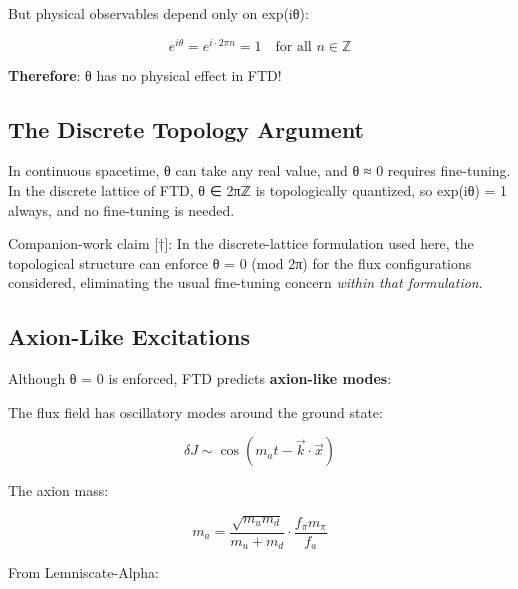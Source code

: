 \documentclass[
  11pt,
  letterpaper,
  twoside,
  openright]{book}
\begin{document}
But physical observables depend only on exp(iθ):

\[e^{i\theta} = e^{i \cdot 2\pi n} = 1 \quad \text{for all } n \in \mathbb{Z}\]

\textbf{Therefore}: θ has no physical effect in FTD!

\subsection{The Discrete Topology
Argument}\label{the-discrete-topology-argument}

In continuous spacetime, θ can take any real value, and θ ≈ 0 requires
fine-tuning. In the discrete lattice of FTD, θ ∈ 2πℤ is topologically
quantized, so exp(iθ) = 1 always, and no fine-tuning is needed.

\begin{tcolorbox}[enhanced jigsaw, coltitle=black, colbacktitle=quarto-callout-important-color!10!white, toprule=.15mm, colframe=quarto-callout-important-color-frame, arc=.35mm, opacityback=0, bottomtitle=1mm, toptitle=1mm, breakable, colback=white, titlerule=0mm, opacitybacktitle=0.6, title=\textcolor{quarto-callout-important-color}{\faExclamation}\hspace{0.5em}{Strong CP: Proposed Mechanism {[}†{]}}, rightrule=.15mm, bottomrule=.15mm, leftrule=.75mm, left=2mm]

Companion-work claim {[}†{]}: In the discrete-lattice formulation used
here, the topological structure can enforce θ = 0 (mod 2π) for the flux
configurations considered, eliminating the usual fine-tuning concern
\emph{within that formulation}.

\end{tcolorbox}

\subsection{Axion-Like Excitations}\label{axion-like-excitations}

Although θ = 0 is enforced, FTD predicts \textbf{axion-like modes}:

The flux field has oscillatory modes around the ground state:

\[\delta J \sim \cos(m_a t - \vec{k} \cdot \vec{x})\]

The axion mass:

\[m_a = \frac{\sqrt{m_u m_d}}{m_u + m_d} \cdot \frac{f_\pi m_\pi}{f_a}\]

From Lemniscate-Alpha:
\end{document}
